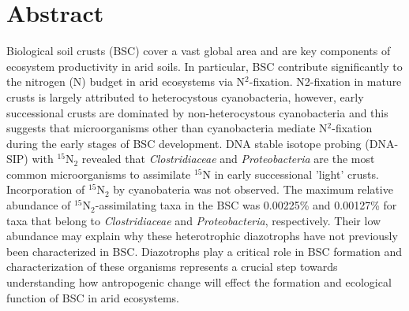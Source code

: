 \section{Abstract}
Biological soil crusts (BSC) cover a vast global area and are key components of
ecosystem productivity in arid soils. In particular, BSC contribute
significantly to the nitrogen (N) budget in arid ecosystems via N$^{2}$-fixation.
N2-fixation in mature crusts is largely attributed to heterocystous
cyanobacteria, however, early successional crusts are dominated by
non-heterocystous cyanobacteria and this suggests that microorganisms other
than cyanobacteria mediate N$^{2}$-fixation during the early stages of BSC
development. DNA stable isotope probing (DNA-SIP) with $^{15}$N$_{2}$ revealed
that \textit{Clostridiaceae} and \textit{Proteobacteria} are the most common
microorganisms to assimilate $^{15}$N in early successional 'light' crusts.
Incorporation of $^{15}$N$_{2}$ by cyanobateria was not observed. The maximum
relative abundance of $^{15}$N$_{2}$-assimilating taxa in the BSC was 0.00225\%
and 0.00127\% for taxa that belong to \textit{Clostridiaceae} and
\textit{Proteobacteria}, respectively. Their low abundance may
explain why these heterotrophic diazotrophs have not previously been
characterized in BSC.  Diazotrophs play a critical role in BSC formation and
characterization of these organisms represents a crucial step towards
understanding how antropogenic change will effect the formation and ecological
function of BSC in arid ecosystems.


